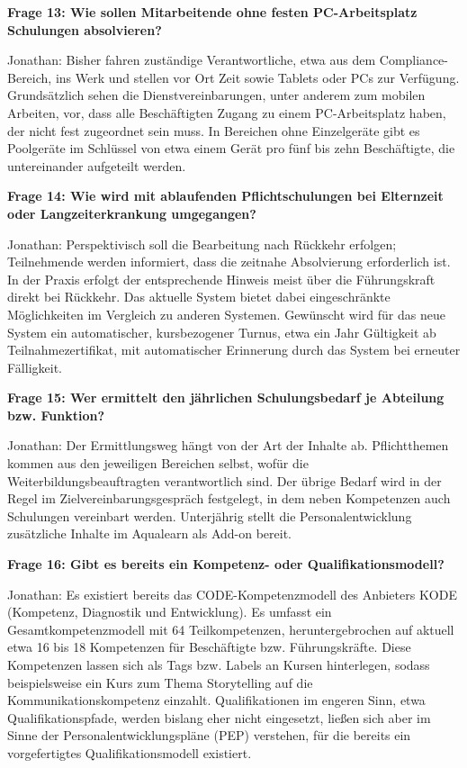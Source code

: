 \documentclass[
    12pt, 
    a4paper,
    ]{scrartcl} %
\begin{document}
\medskip
\textbf{Frage 13: Wie sollen Mitarbeitende ohne festen PC-Arbeitsplatz Schulungen absolvieren?}

Jonathan: Bisher fahren zust\"andige Verantwortliche, etwa aus dem Compliance-Bereich, ins Werk und stellen vor Ort Zeit sowie Tablets oder PCs zur Verf\"ugung. Grunds\"atzlich sehen die Dienstvereinbarungen, unter anderem zum mobilen Arbeiten, vor, dass alle Besch\"aftigten Zugang zu einem PC-Arbeitsplatz haben, der nicht fest zugeordnet sein muss. In Bereichen ohne Einzelger\"ate gibt es Poolger\"ate im Schl\"ussel von etwa einem Ger\"at pro f\"unf bis zehn Besch\"aftigte, die untereinander aufgeteilt werden.

\medskip
\textbf{Frage 14: Wie wird mit ablaufenden Pflichtschulungen bei Elternzeit oder Langzeiterkrankung umgegangen?}

Jonathan: Perspektivisch soll die Bearbeitung nach R\"uckkehr erfolgen; Teilnehmende werden informiert, dass die zeitnahe Absolvierung erforderlich ist. In der Praxis erfolgt der entsprechende Hinweis meist \"uber die F\"uhrungskraft direkt bei R\"uckkehr. Das aktuelle System bietet dabei eingeschr\"ankte M\"oglichkeiten im Vergleich zu anderen Systemen. Gew\"unscht wird f\"ur das neue System ein automatischer, kursbezogener Turnus, etwa ein Jahr G\"ultigkeit ab Teilnahmezertifikat, mit automatischer Erinnerung durch das System bei erneuter F\"alligkeit.

\bigskip
{}

\textbf{Frage 15: Wer ermittelt den j\"ahrlichen Schulungsbedarf je Abteilung bzw. Funktion?}

Jonathan: Der Ermittlungsweg h\"angt von der Art der Inhalte ab. Pflichtthemen kommen aus den jeweiligen Bereichen selbst, wof\"ur die Weiterbildungsbeauftragten verantwortlich sind. Der \"ubrige Bedarf wird in der Regel im Zielvereinbarungsgespr\"ach festgelegt, in dem neben Kompetenzen auch Schulungen vereinbart werden. Unterj\"ahrig stellt die Personalentwicklung zus\"atzliche Inhalte im Aqualearn als Add-on bereit.

\medskip
\textbf{Frage 16: Gibt es bereits ein Kompetenz- oder Qualifikationsmodell?}

Jonathan: Es existiert bereits das CODE-Kompetenzmodell des Anbieters KODE (Kompetenz, Diagnostik und Entwicklung). Es umfasst ein Gesamtkompetenzmodell mit 64 Teilkompetenzen, heruntergebrochen auf aktuell etwa 16 bis 18 Kompetenzen f\"ur Besch\"aftigte bzw. F\"uhrungskr\"afte. Diese Kompetenzen lassen sich als Tags bzw. Labels an Kursen hinterlegen, sodass beispielsweise ein Kurs zum Thema Storytelling auf die Kommunikationskompetenz einzahlt. Qualifikationen im engeren Sinn, etwa Qualifikationspfade, werden bislang eher nicht eingesetzt, lie{\ss}en sich aber im Sinne der Personalentwicklungspl\"ane (PEP) verstehen, f\"ur die bereits ein vorgefertigtes Qualifikationsmodell existiert.
\end{document}
